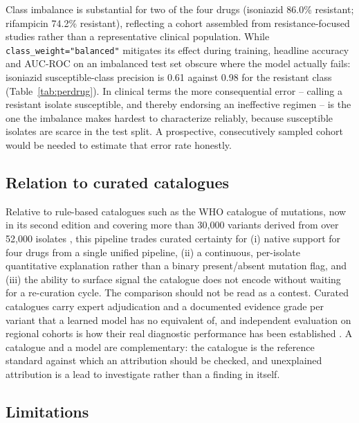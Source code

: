 Class imbalance is substantial for two of the four drugs (isoniazid 86.0\% resistant; rifampicin 74.2\% resistant), reflecting a cohort assembled from resistance-focused studies rather than a representative clinical population. While \texttt{class\_weight="balanced"} mitigates its effect during training, headline accuracy and AUC-ROC on an imbalanced test set obscure where the model actually fails: isoniazid susceptible-class precision is 0.61 against 0.98 for the resistant class (Table~\ref{tab:perdrug}). In clinical terms the more consequential error -- calling a resistant isolate susceptible, and thereby endorsing an ineffective regimen -- is the one the imbalance makes hardest to characterize reliably, because susceptible isolates are scarce in the test split. A prospective, consecutively sampled cohort would be needed to estimate that error rate honestly.

\subsection{Relation to curated catalogues}

Relative to rule-based catalogues such as the WHO catalogue of mutations, now in its second edition and covering more than 30{,}000 variants derived from over 52{,}000 isolates \cite{who2023catalogue}, this pipeline trades curated certainty for (i) native support for four drugs from a single unified pipeline, (ii) a continuous, per-isolate quantitative explanation rather than a binary present/absent mutation flag, and (iii) the ability to surface signal the catalogue does not encode without waiting for a re-curation cycle. The comparison should not be read as a contest. Curated catalogues carry expert adjudication and a documented evidence grade per variant that a learned model has no equivalent of, and independent evaluation on regional cohorts is how their real diagnostic performance has been established \cite{garciamarin2024role}. A catalogue and a model are complementary: the catalogue is the reference standard against which an attribution should be checked, and unexplained attribution is a lead to investigate rather than a finding in itself.

\subsection{Limitations}

